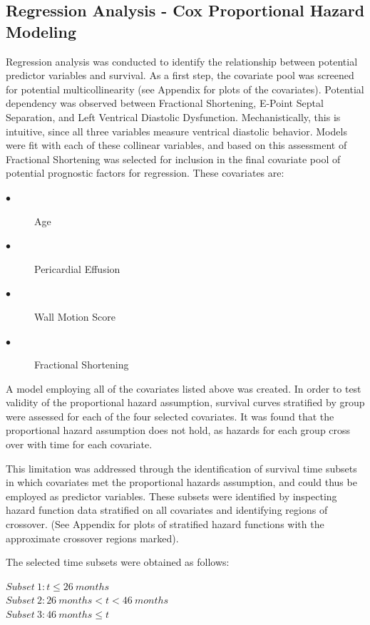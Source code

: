 \documentclass[
]{article}
\begin{document}
\hypertarget{regression-analysis---cox-proportional-hazard-modeling}{%
\subsection{Regression Analysis - Cox Proportional Hazard
Modeling}\label{regression-analysis---cox-proportional-hazard-modeling}}

Regression analysis was conducted to identify the relationship between
potential predictor variables and survival. As a first step, the
covariate pool was screened for potential multicollinearity (see
Appendix for plots of the covariates). Potential dependency was observed
between Fractional Shortening, E-Point Septal Separation, and Left
Ventrical Diastolic Dysfunction. Mechanistically, this is intuitive,
since all three variables measure ventrical diastolic behavior. Models
were fit with each of these collinear variables, and based on this
assessment of Fractional Shortening was selected for inclusion in the
final covariate pool of potential prognostic factors for regression.
These covariates are:

\begin{description}
  \item[$\bullet$] Age
  \item[$\bullet$] Pericardial Effusion
  \item[$\bullet$] Wall Motion Score
  \item[$\bullet$] Fractional Shortening
\end{description}

A model employing all of the covariates listed above was created. In
order to test validity of the proportional hazard assumption, survival
curves stratified by group were assessed for each of the four selected
covariates. It was found that the proportional hazard assumption does
not hold, as hazards for each group cross over with time for each
covariate.

This limitation was addressed through the identification of survival
time subsets in which covariates met the proportional hazards
assumption, and could thus be employed as predictor variables. These
subsets were identified by inspecting hazard function data stratified on
all covariates and identifying regions of crossover. (See Appendix for
plots of stratified hazard functions with the approximate crossover
regions marked).

The selected time subsets were obtained as follows:

\begin{description}
 \item[$Subset \:1: t \leq {26} \:{months}$]
 \item[$Subset \:2:26 \:{months}< t < 46 \:{months}$]
 \item[$Subset \:3: 46 \: months \leq t$]
\end{description}
\end{document}

